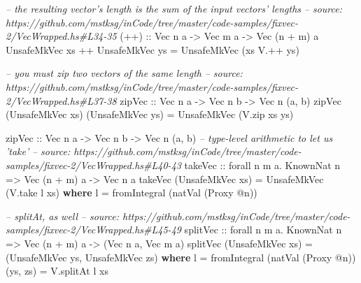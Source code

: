 \documentclass[]{article}
\newenvironment{Shaded}{}{}
\newcommand{\KeywordTok}[1]{\textcolor[rgb]{0.00,0.44,0.13}{\textbf{#1}}}
\newcommand{\DataTypeTok}[1]{\textcolor[rgb]{0.56,0.13,0.00}{#1}}
\newcommand{\CommentTok}[1]{\textcolor[rgb]{0.38,0.63,0.69}{\textit{#1}}}
\newcommand{\OtherTok}[1]{\textcolor[rgb]{0.00,0.44,0.13}{#1}}
\newcommand{\FunctionTok}[1]{\textcolor[rgb]{0.02,0.16,0.49}{#1}}
\newcommand{\NormalTok}[1]{#1}
\begin{document}
\begin{Shaded}
\begin{Highlighting}[]
\CommentTok{-- the resulting vector's length is the sum of the input vectors' lengths}
\CommentTok{-- source: https://github.com/mstksg/inCode/tree/master/code-samples/fixvec-2/VecWrapped.hs#L34-35}
\OtherTok{(++) ::} \DataTypeTok{Vec}\NormalTok{ n a }\OtherTok{->} \DataTypeTok{Vec}\NormalTok{ m a }\OtherTok{->} \DataTypeTok{Vec}\NormalTok{ (n }\FunctionTok{+}\NormalTok{ m) a}
\DataTypeTok{UnsafeMkVec}\NormalTok{ xs }\FunctionTok{++} \DataTypeTok{UnsafeMkVec}\NormalTok{ ys }\FunctionTok{=} \DataTypeTok{UnsafeMkVec}\NormalTok{ (xs }\FunctionTok{V.++}\NormalTok{ ys)}


\CommentTok{-- you must zip two vectors of the same length}
\CommentTok{-- source: https://github.com/mstksg/inCode/tree/master/code-samples/fixvec-2/VecWrapped.hs#L37-38}
\OtherTok{zipVec ::} \DataTypeTok{Vec}\NormalTok{ n a }\OtherTok{->} \DataTypeTok{Vec}\NormalTok{ n b }\OtherTok{->} \DataTypeTok{Vec}\NormalTok{ n (a, b)}
\NormalTok{zipVec (}\DataTypeTok{UnsafeMkVec}\NormalTok{ xs) (}\DataTypeTok{UnsafeMkVec}\NormalTok{ ys) }\FunctionTok{=} \DataTypeTok{UnsafeMkVec}\NormalTok{ (V.zip xs ys)}


\OtherTok{zipVec ::} \DataTypeTok{Vec}\NormalTok{ n a }\OtherTok{->} \DataTypeTok{Vec}\NormalTok{ n b }\OtherTok{->} \DataTypeTok{Vec}\NormalTok{ n (a, b)}
\CommentTok{-- type-level arithmetic to let us 'take'}
\CommentTok{-- source: https://github.com/mstksg/inCode/tree/master/code-samples/fixvec-2/VecWrapped.hs#L40-43}
\OtherTok{takeVec ::}\NormalTok{ forall n m a}\FunctionTok{.} \DataTypeTok{KnownNat}\NormalTok{ n }\OtherTok{=>} \DataTypeTok{Vec}\NormalTok{ (n }\FunctionTok{+}\NormalTok{ m) a }\OtherTok{->} \DataTypeTok{Vec}\NormalTok{ n a}
\NormalTok{takeVec (}\DataTypeTok{UnsafeMkVec}\NormalTok{ xs) }\FunctionTok{=} \DataTypeTok{UnsafeMkVec}\NormalTok{ (V.take l xs)}
  \KeywordTok{where}
\NormalTok{    l }\FunctionTok{=}\NormalTok{ fromIntegral (natVal (}\DataTypeTok{Proxy} \FunctionTok{@}\NormalTok{n))}


\CommentTok{-- splitAt, as well}
\CommentTok{-- source: https://github.com/mstksg/inCode/tree/master/code-samples/fixvec-2/VecWrapped.hs#L45-49}
\OtherTok{splitVec ::}\NormalTok{ forall n m a}\FunctionTok{.} \DataTypeTok{KnownNat}\NormalTok{ n }\OtherTok{=>} \DataTypeTok{Vec}\NormalTok{ (n }\FunctionTok{+}\NormalTok{ m) a }\OtherTok{->}\NormalTok{ (}\DataTypeTok{Vec}\NormalTok{ n a, }\DataTypeTok{Vec}\NormalTok{ m a)}
\NormalTok{splitVec (}\DataTypeTok{UnsafeMkVec}\NormalTok{ xs) }\FunctionTok{=}\NormalTok{ (}\DataTypeTok{UnsafeMkVec}\NormalTok{ ys, }\DataTypeTok{UnsafeMkVec}\NormalTok{ zs)}
  \KeywordTok{where}
\NormalTok{    l }\FunctionTok{=}\NormalTok{ fromIntegral (natVal (}\DataTypeTok{Proxy} \FunctionTok{@}\NormalTok{n))}
\NormalTok{    (ys, zs) }\FunctionTok{=}\NormalTok{ V.splitAt l xs}
\end{Highlighting}
\end{Shaded}
\end{document}
